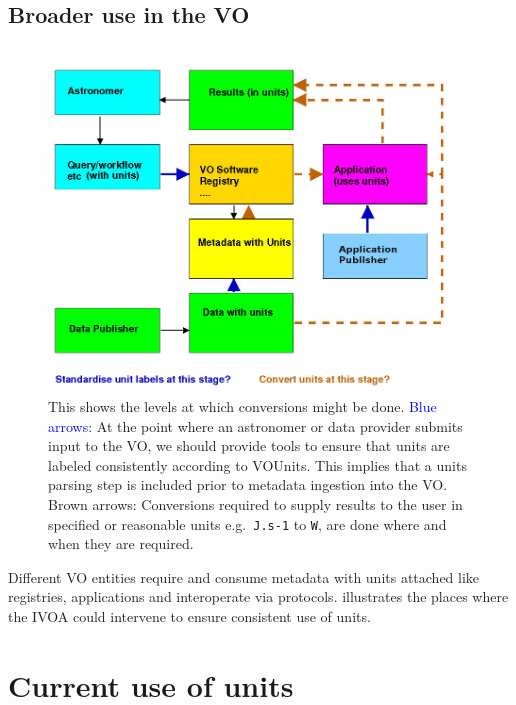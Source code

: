 \documentclass[11pt,notitlepage,onecolumn]{ivoa}
\def\eg{e.g.~}
\newcommand{\brown}{\textcolor[rgb]{0.50,0.10,0.10}}
\begin{document}
\subsection{Broader use in the VO}

\begin{figure}[thb]
  \includegraphics[width=\textwidth]{./units2.jpg}
  \caption{This shows the levels at which conversions might be done.
\textcolor{blue}{Blue arrows}: At the point where an astronomer or
  data provider submits input to the VO, we should provide tools to
  ensure that units are labeled consistently according to VOUnits. 
  This implies that a units parsing step is included prior to metadata ingestion into the VO.
\brown{Brown arrows}: Conversions required to supply results to
  the user in specified or reasonable units \eg  \texttt{J.s-1} to \texttt{W}, are done where and when they are required.}
  \label{fig:units2}
\end{figure}

Different VO entities require and consume metadata with units attached like registries, 
applications and interoperate via protocols.  illustrates the places where the IVOA
could intervene to ensure consistent use of units.


\newpage

\appendix

\section{Current use of units}
\label{appx:current}
\end{document}
